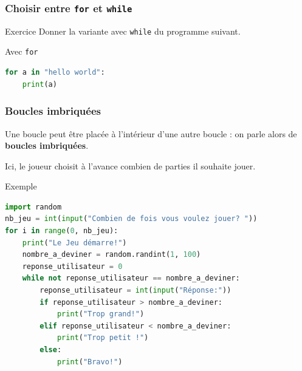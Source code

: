 \documentclass[10pt]{beamer}
\begin{document}
\begin{frame}[containsverbatim]
	\frametitle{Choisir entre \texttt{for} et \texttt{while}}
	
	\begin{alertblock}{Exercice}
		Donner la variante avec \texttt{while} du programme suivant.
	\end{alertblock}
	
	\vspace{0.2cm}
	
	\begin{exampleblock}{Avec \texttt{for}}
		\begin{lstlisting}[language=Python]
for a in "hello world":
	print(a)
		\end{lstlisting}
	\end{exampleblock}
	

\end{frame}


\begin{frame}[containsverbatim]
	\frametitle{Boucles imbriquées}
	

		Une boucle peut être placée à l'intérieur d'une autre boucle :
		on parle alors de \textbf{boucles imbriquées}.
		

		
		Ici, le joueur choisit à l'avance combien de parties il souhaite jouer.

	

	
	\begin{exampleblock}{Exemple}
		\begin{lstlisting}[language=Python]
import random
nb_jeu = int(input("Combien de fois vous voulez jouer? "))
for i in range(0, nb_jeu):
	print("Le Jeu démarre!")
	nombre_a_deviner = random.randint(1, 100)
	reponse_utilisateur = 0
	while not reponse_utilisateur == nombre_a_deviner:
		reponse_utilisateur = int(input("Réponse:"))
		if reponse_utilisateur > nombre_a_deviner:
			print("Trop grand!")
		elif reponse_utilisateur < nombre_a_deviner:
			print("Trop petit !")
		else:
			print("Bravo!")
		\end{lstlisting}
	\end{exampleblock}
	
\end{frame}
\end{document}
